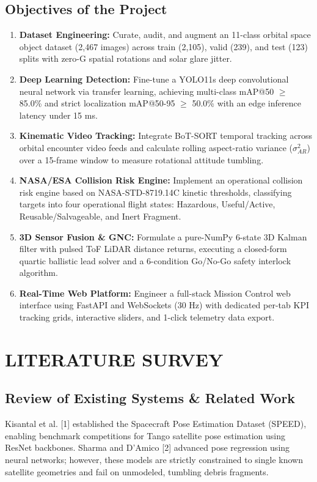 \documentclass[12pt]{report}
\begin{document}
\section{Objectives of the Project}
\begin{enumerate}
    \item \textbf{Dataset Engineering:} Curate, audit, and augment an 11-class orbital space object dataset (2,467 images) across train (2,105), valid (239), and test (123) splits with zero-G spatial rotations and solar glare jitter.
    \item \textbf{Deep Learning Detection:} Fine-tune a YOLO11s deep convolutional neural network via transfer learning, achieving multi-class mAP@50 $\ge$ 85.0\% and strict localization mAP@50-95 $\ge$ 50.0\% with an edge inference latency under 15 ms.
    \item \textbf{Kinematic Video Tracking:} Integrate BoT-SORT temporal tracking across orbital encounter video feeds and calculate rolling aspect-ratio variance ($\sigma^2_{AR}$) over a 15-frame window to measure rotational attitude tumbling.
    \item \textbf{NASA/ESA Collision Risk Engine:} Implement an operational collision risk engine based on NASA-STD-8719.14C kinetic thresholds, classifying targets into four operational flight states: Hazardous, Useful/Active, Reusable/Salvageable, and Inert Fragment.
    \item \textbf{3D Sensor Fusion \& GNC:} Formulate a pure-NumPy 6-state 3D Kalman filter with pulsed ToF LiDAR distance returns, executing a closed-form quartic ballistic lead solver and a 6-condition Go/No-Go safety interlock algorithm.
    \item \textbf{Real-Time Web Platform:} Engineer a full-stack Mission Control web interface using FastAPI and WebSockets (30 Hz) with dedicated per-tab KPI tracking grids, interactive sliders, and 1-click telemetry data export.
\end{enumerate}

\chapter{LITERATURE SURVEY}
\section{Review of Existing Systems \& Related Work}
Kisantal et al. [1] established the Spacecraft Pose Estimation Dataset (SPEED), enabling benchmark competitions for Tango satellite pose estimation using ResNet backbones. Sharma and D'Amico [2] advanced pose regression using neural networks; however, these models are strictly constrained to single known satellite geometries and fail on unmodeled, tumbling debris fragments.
\end{document}
